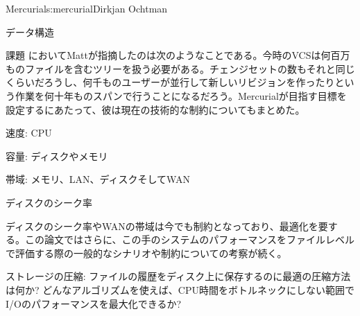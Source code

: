 \begin{aosachapter}{Mercurial}{s:mercurial}{Dirkjan Ochtman}
\begin{aosasect1}{データ構造}
\begin{aosasect2}{課題}
\cite{bib:mackall:better}においてMattが指摘したのは次のようなことである。今時のVCSは何百万ものファイルを含むツリーを扱う必要がある。チェンジセットの数もそれと同じくらいだろうし、何千ものユーザーが並行して新しいリビジョンを作ったりという作業を何十年ものスパンで行うことになるだろう。Mercurialが目指す目標を設定するにあたって、彼は現在の技術的な制約についてもまとめた。

\begin{aosaitemize}

  \item 速度: CPU

  \item 容量: ディスクやメモリ

  \item 帯域: メモリ、LAN、ディスクそしてWAN

  \item ディスクのシーク率

\end{aosaitemize}

ディスクのシーク率やWANの帯域は今でも制約となっており、最適化を要する。この論文ではさらに、この手のシステムのパフォーマンスをファイルレベルで評価する際の一般的なシナリオや制約についての考察が続く。

\begin{aosaitemize}

  \item ストレージの圧縮: ファイルの履歴をディスク上に保存するのに最適の圧縮方法は何か? どんなアルゴリズムを使えば、CPU時間をボトルネックにしない範囲でI/Oのパフォーマンスを最大化できるか?


\end{aosaitemize}
\end{aosasect2}
\end{aosasect1}
\end{aosachapter}
